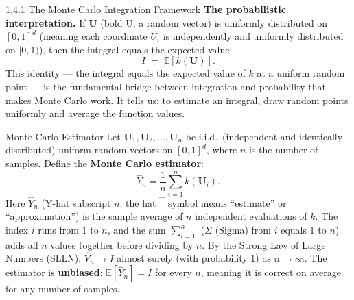 \documentclass[aspectratio=169,10pt]{beamer}
\begin{document}
\begin{frame}[allowframebreaks]{1.4.1 The Monte Carlo Integration Framework}
  \textbf{The probabilistic interpretation.}  If $\mathbf{U}$ (bold U, a
  random vector) is uniformly distributed on $[0,1]^d$ (meaning each coordinate
  $U_i$ is independently and uniformly distributed on $[0,1)$), then the
  integral equals the expected value:
  \[
    I \;=\; \mathbb{E}[k(\mathbf{U})].
  \]
  This identity --- the integral equals the expected value of $k$ at a uniform
  random point --- is the fundamental bridge between integration and probability
  that makes Monte Carlo work.  It tells us: to estimate an integral, draw
  random points uniformly and average the function values.

  \begin{block}{Monte Carlo Estimator}
    Let $\mathbf{U}_1, \mathbf{U}_2, \ldots, \mathbf{U}_n$ be i.i.d.\
    (independent and identically distributed) uniform random vectors on
    $[0,1]^d$, where $n$ is the number of samples.  Define the
    \textbf{Monte Carlo estimator}:
    \[
      \hat{Y}_n = \frac{1}{n} \sum_{i=1}^{n} k(\mathbf{U}_i).
      \tag{1.2.2}
    \]
    Here $\hat{Y}_n$ (Y-hat subscript $n$; the hat $\hat{\phantom{Y}}$ symbol
    means ``estimate'' or ``approximation'') is the sample average of $n$
    independent evaluations of $k$.  The index $i$ runs from 1 to $n$, and the
    sum $\sum_{i=1}^n$ ($\Sigma$ (Sigma) from $i$ equals 1 to $n$) adds all
    $n$ values together before dividing by $n$.  By the Strong Law of Large
    Numbers (SLLN), $\hat{Y}_n \to I$ almost surely (with probability 1) as
    $n \to \infty$.  The estimator is \textbf{unbiased}:
    $\mathbb{E}[\hat{Y}_n] = I$ for every $n$, meaning it is correct on
    average for any number of samples.
  \end{block}

  \framebreak


\end{frame}
\end{document}
